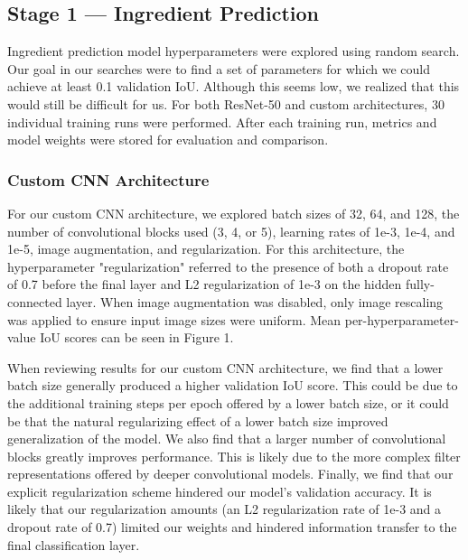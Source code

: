 \documentclass[10pt,twocolumn,letterpaper]{article}
\begin{document}
\subsection{Stage 1 --- Ingredient Prediction}
Ingredient prediction model hyperparameters were explored using random search. Our goal in our searches were to find a set of parameters for which we could achieve at least 0.1 validation IoU. Although this seems low, we realized that this would still be difficult for us. For both ResNet-50 and custom architectures, 30 individual training runs were performed. After each training run, metrics and model weights were stored for evaluation and comparison.

\subsubsection{Custom CNN Architecture}
For our custom CNN architecture, we explored batch sizes of 32, 64, and 128, the number of convolutional blocks used (3, 4, or 5), learning rates of 1e-3, 1e-4, and 1e-5, image augmentation, and regularization. For this architecture, the hyperparameter "regularization" referred to the presence of both a dropout rate of 0.7 before the final layer and L2 regularization of 1e-3 on the hidden fully-connected layer. When image augmentation was disabled, only image rescaling was applied to ensure input image sizes were uniform. Mean per-hyperparameter-value IoU scores can be seen in Figure 1.

When reviewing results for our custom CNN architecture, we find that a lower batch size generally produced a higher validation IoU score. This could be due to the additional training steps per epoch offered by a lower batch size, or it could be that the natural regularizing effect of a lower batch size improved generalization of the model. We also find that a larger number of convolutional blocks greatly improves performance. This is likely due to the more complex filter representations offered by deeper convolutional models. Finally, we find that our explicit regularization scheme hindered our model's validation accuracy. It is likely that our regularization amounts (an L2 regularization rate of 1e-3 and a dropout rate of 0.7) limited our weights and hindered information transfer to the final classification layer.
\end{document}

